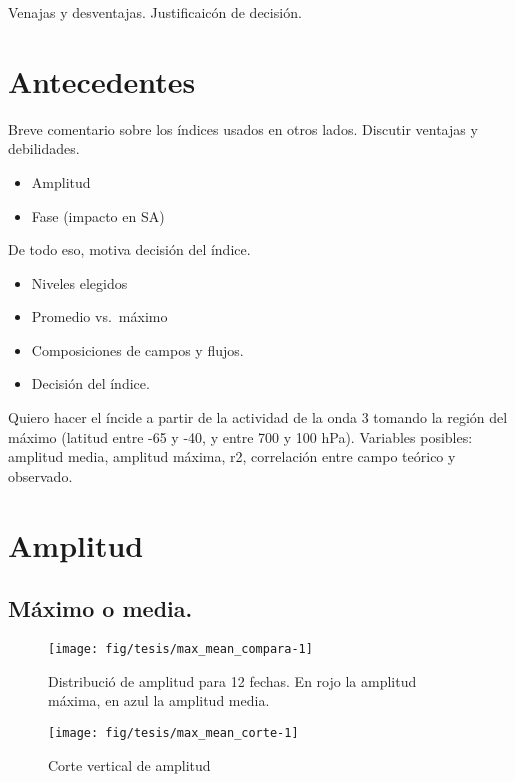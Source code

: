 \documentclass[spanish,a4paper]{book}
\providecommand{\tightlist}{%
  \setlength{\itemsep}{0pt}\setlength{\parskip}{0pt}}
\begin{document}
Venajas y desventajas. Justificaicón de decisión.

\section{Antecedentes}\label{antecedentes}

Breve comentario sobre los índices usados en otros lados. Discutir
ventajas y debilidades.

\begin{itemize}
\tightlist
\item
  Amplitud
\item
  Fase (impacto en SA)
\end{itemize}

De todo eso, motiva decisión del índice.

\begin{itemize}
\tightlist
\item
  Niveles elegidos
\item
  Promedio vs.~máximo
\item
  Composiciones de campos y flujos.
\item
  Decisión del índice.
\end{itemize}

Quiero hacer el íncide a partir de la actividad de la onda 3 tomando la
región del máximo (latitud entre -65 y -40, y entre 700 y 100 hPa).
Variables posibles: amplitud media, amplitud máxima, r2, correlación
entre campo teórico y observado.

\section{Amplitud}\label{amplitud}

\subsection{Máximo o media.}\label{maximo-o-media.}

\begin{figure*}
\texttt{[image: fig/tesis/max\_mean\_compara-1]} \caption{Distribució de amplitud para 12 fechas. En rojo la amplitud máxima, en azul la amplitud media.}\label{fig:max_mean_compara}
\end{figure*}

\begin{figure*}
\texttt{[image: fig/tesis/max\_mean\_corte-1]} \caption{Corte vertical de amplitud}\label{fig:max_mean_corte}
\end{figure*}
\end{document}
